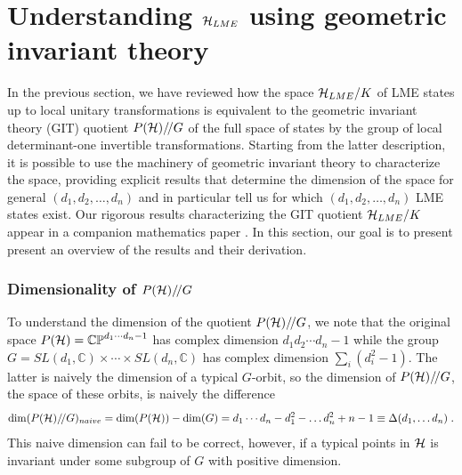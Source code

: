 \documentclass[12pt]{article}
\theoremstyle{definition}
\newcommand{\be}{\begin{equation}}
\newcommand{\ee}{\end{equation}}
\newcommand{\GITquot}{/\!/}
\begin{document}
\section{Understanding ${\cal H}_{LME}$ using geometric invariant theory}

In the previous section, we have reviewed how the space ${\cal H}_{LME}/K$ of LME states up to local unitary transformations is equivalent to the geometric invariant theory (GIT) quotient $P({\cal H})\GITquot G$ of the full space of states by the group of local determinant-one invertible transformations. Starting from the latter description, it is possible to use the machinery of geometric invariant theory to characterize the space, providing explicit results that determine the dimension of the space for general $(d_1, d_2, \dots, d_n)$ and in particular tell us for which $(d_1, d_2, \dots, d_n)$ LME states exist. Our rigorous results characterizing the GIT quotient ${\cal H}_{LME}/K$ appear in a companion mathematics paper \cite{mathpaper}. In this section, our goal is to present present an overview of the results and their derivation.

\subsubsection*{Dimensionality of $P({\cal H})\GITquot G$}

To understand the dimension of the quotient $P({\cal H})\GITquot G$, we note that the original space $P({\cal H}) = \mathbb{CP}^{d_1 \cdots d_n -1}$ has complex dimension $d_1 d_2 \cdots d_n - 1$ while the group $G = SL(d_1, \mathbb{C}) \times \cdots \times SL(d_n, \mathbb{C})$ has complex dimension $\sum_i (d_i^2 -1)$. The latter is naively the dimension of a typical $G$-orbit, so the dimension of $P({\cal H})\GITquot G$, the space of these orbits, is naively the difference
\be
{\rm dim}(P({\cal H})\GITquot G)_{naive} = {\rm dim}(P({\cal H})) - {\rm dim}(G) = d_1 \cdots d_n - d_1^2 - \dots d_n^2  +  n - 1 \equiv \Delta(d_1, \dots d_n)\; .
\ee
This naive dimension can fail to be correct, however, if a typical points in ${\cal H}$ is invariant under some subgroup of $G$ with positive dimension.
\end{document}
